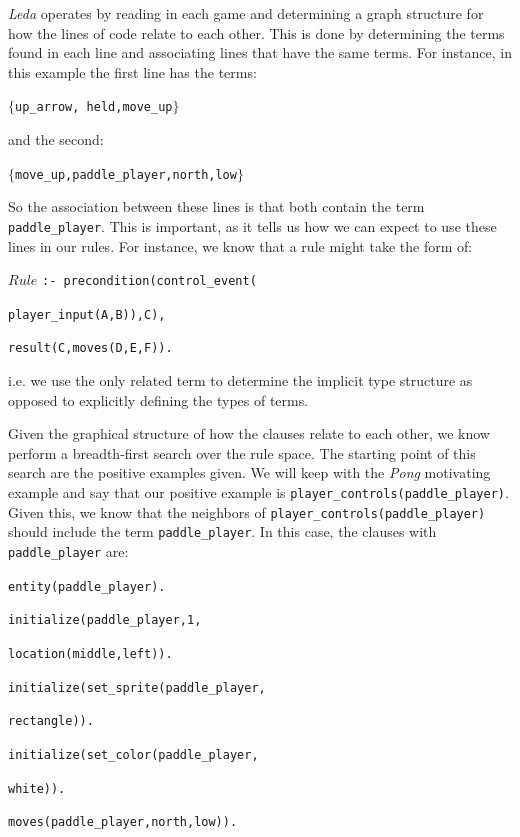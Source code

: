 \documentclass[12pt]{report}
\begin{document}
\textit{Leda} operates by reading in each game and determining a graph structure for how the lines of code relate to each other. This is done by determining the terms found in each line and associating lines that have the same terms. For instance, in this example the first line has the terms:

$\{$\texttt{up\_arrow, held,move\_up}$\}$

\noindent and the second:

$\{$\texttt{move\_up,paddle\_player,north,low}$\}$

So the association between these lines is that both contain the term \texttt{paddle\_player}. This is important, as it tells us how we can expect to use these lines in our rules. For instance, we know that a rule might take the form of:

\noindent $Rule$ \texttt{:- precondition(control\_event(} 

\hspace{3cm} \texttt{player\_input(A,B)),C),}

\hspace{1cm} \texttt{result(C,moves(D,E,F)).}

i.e. we use the only related term to determine the implicit type structure as opposed to explicitly defining the types of terms. 

Given the graphical structure of how the clauses relate to each other, we know perform a breadth-first search over the rule space. The starting point of this search are the positive examples given. We will keep with the \textit{Pong} motivating example and say that our positive example is \texttt{player\_controls(paddle\_player)}. Given this, we know that the neighbors of \texttt{player\_controls(paddle\_player)} should include the term \texttt{paddle\_player}. In this case, the clauses with \texttt{paddle\_player} are:

\noindent \texttt{entity(paddle\_player).}

\noindent \texttt{initialize(paddle\_player,1,}

\texttt{location(middle,left)).}

\noindent \texttt{initialize(set\_sprite(paddle\_player,}

\texttt{rectangle)).}

\noindent \texttt{initialize(set\_color(paddle\_player,}

\texttt{white)).}

\noindent \texttt{moves(paddle\_player,north,low)).}
\end{document}
